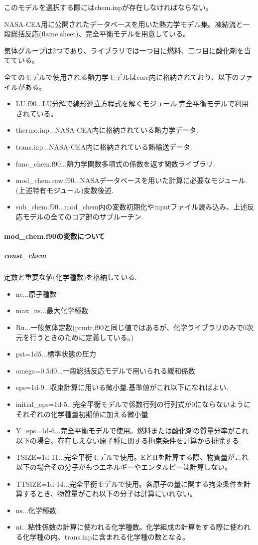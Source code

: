 \documentclass{jsarticle}
\begin{document}
このモデルを選択する際にはchem.inpが存在しなければならない。

NASA-CEA用に公開されたデータベースを用いた熱力学モデル集。凍結流と一段総括反応(flame sheet)、完全平衡モデルを用意している。

気体グループは2つであり、ライブラリでは一つ目に燃料、二つ目に酸化剤を当てている。

全てのモデルで使用される熱力学モデルはcore内に格納されており、以下のファイルがある。
\begin{itemize}
\item LU.f90...LU分解で線形連立方程式を解くモジュール.完全平衡モデルで利用されている。
\item thermo.inp...NASA-CEA内に格納されている熱力学データ.
\item trans.inp...NASA-CEA内に格納されている熱輸送データ.
\item func\_chem.f90...熱力学関数多項式の係数を返す関数ライブラリ.
\item mod\_chem.raw.f90...NASAデータベースを用いた計算に必要なモジュール.(上述特有モジュール)変数後述.
\item sub\_chem.f90...mod\_chem内の変数初期化やinputファイル読み込み、上述反応モデルの全てのコア部のサブルーチン.
\end{itemize}

\paragraph{mod\_chem.f90の変数について}%
\subparagraph{const\_chem}定数と重要な値(化学種数)を格納している.
\begin{itemize}
\item ne...原子種数
\item max\_ns...最大化学種数
\item Ru...一般気体定数(prmtr.f90と同じ値ではあるが、化学ライブラリのみで0次元を行うときのために定義している。)
\item pst=1d5...標準状態の圧力
\item omega=0.5d0...一段総括反応モデルで用いられる緩和係数
\item eps=1d-9...収束計算に用いる微小量.基準値がこれ以下になればよい.
\item initial\_eps=1d-5...完全平衡モデルで係数行列の行列式が0にならないようにそれぞれの化学種量初期値に加える微小量
\item Y\_eps=1d-6...完全平衡モデルで使用。燃料または酸化剤の質量分率がこれ以下の場合、存在しえない原子種に関する拘束条件を計算から排除する.
\item TSIZE=1d-11...完全平衡モデルで使用。EとHを計算する際、物質量がこれ以下の場合その分子がもつエネルギーやエンタルピーは計算しない。
\item TTSIZE=1d-14...完全平衡モデルで使用。各原子の量に関する拘束条件を計算するとき、物質量がこれ以下の分子は計算にいれない。
\item ns...化学種数.
\item nt...粘性係数の計算に使われる化学種数。化学組成の計算をする際に使われる化学種の内、trans.inpに含まれる化学種の数となる。
\end{itemize}
\end{document}
